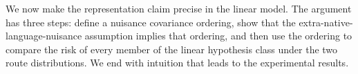





We now make the representation claim precise in the linear model. The argument
has three steps: define a nuisance covariance ordering, show that the
extra-native-language-nuisance assumption implies that ordering, and then use
the ordering to compare the risk of every member of the linear hypothesis class
under the two route distributions. We end with intuition that leads to the experimental results.

\label{sec:covariance-ordering}

